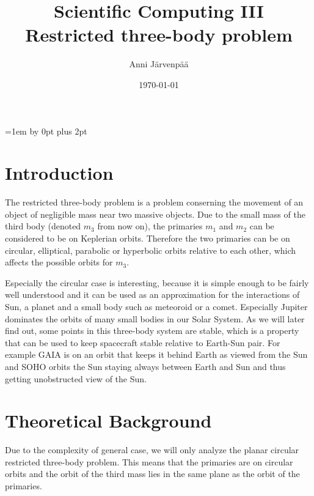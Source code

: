 \documentclass[12pt,a4paper,titlepage]{article}
\title{Scientific Computing III \\ Restricted three-body problem \vspace{0.5em}}
\author{Anni Järvenpää}
\date{\today}
\begin{document}
\maketitle

\newpage
\thispagestyle{empty}
\tableofcontents
\newpage
\setcounter{page}{1}
\parskip=1em \advance\parskip by 0pt plus 2pt
\pagestyle{fancy}



\section{Introduction}
The restricted three-body problem is a problem conserning the movement of an object of negligible mass near two massive objects. Due to the small mass of the third body (denoted $m_3$ from now on), the primaries $m_1$ and $m_2$ can be considered to be on Keplerian orbits. Therefore the two primaries can be on circular, elliptical, parabolic or hyperbolic orbits relative to each other, which affects the possible orbits for $m_3$. \cite{dj}

Especially the circular case is interesting, because it is simple enough to be fairly well understood and it can be used as an approximation for the interactions of Sun, a planet and a small body such as meteoroid or a comet. Especially Jupiter dominates the orbits of many small bodies in our Solar System. As we will later find out, some points in this three-body system are stable, which is a property that can be used to keep spacecraft stable relative to Earth-Sun pair. For example GAIA is on an orbit that keeps it behind Earth as viewed from the Sun and SOHO orbits the Sun staying always between Earth and Sun and thus getting unobstructed view of the Sun. \cite{dj, gaia, soho}

\section{Theoretical Background}\label{theory}
Due to the complexity of general case, we will only analyze the planar circular restricted three-body problem. This means that the primaries are on circular orbits and the orbit of the third mass lies in the same plane as the orbit of the primaries.
\end{document}
